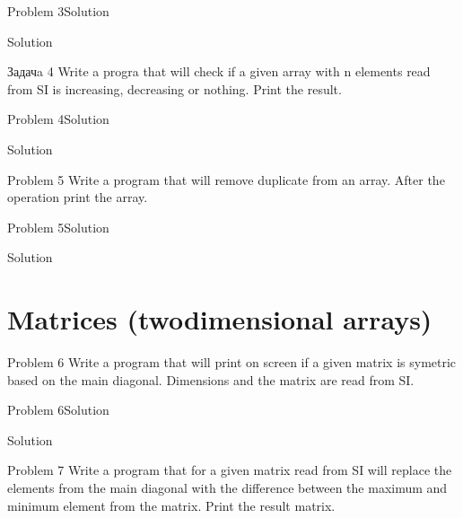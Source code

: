 \begin{frame}[fragile]{Problem 3}{Solution} 
\begin{exampleblock}{Solution}

\end{exampleblock}
\end{frame}

\begin{frame}{Задачa 4}
Write a progra that will check if a given array with n elements read from SI is
increasing, decreasing or nothing. Print the result.
\end{frame}

\begin{frame}[fragile,shrink=10]{Problem 4}{Solution} 
\begin{exampleblock}{Solution}

\end{exampleblock}
\end{frame}

\begin{frame}{Problem 5}
Write a program that will remove duplicate from an array. After the operation
print the array.
\end{frame}

\begin{frame}[fragile]{Problem 5}{Solution} 
\begin{exampleblock}{Solution}

\end{exampleblock}
\end{frame}

\section{Matrices (twodimensional arrays)}

\begin{frame}{Problem 6}
Write a program that will print on screen if a given matrix is symetric based on
the main diagonal. Dimensions and the matrix are read from SI.
\end{frame}

\begin{frame}[fragile]{Problem 6}{Solution} 
\begin{exampleblock}{Solution}

\end{exampleblock}
\end{frame}


\begin{frame}{Problem 7}
Write a program that for a given matrix read from SI will replace the elements
from the main diagonal with the difference between the maximum and minimum
element from the matrix. Print the result matrix.
\end{frame}

